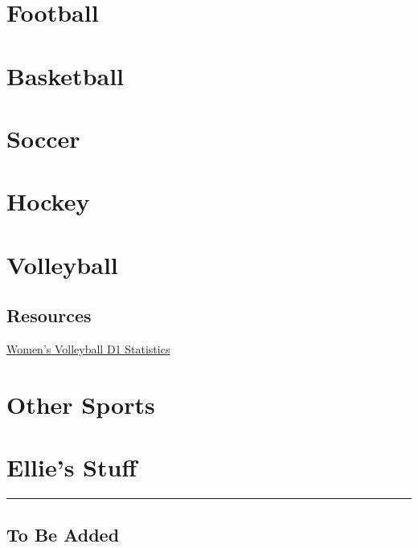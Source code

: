 \documentclass[
]{book}
\theoremstyle{definition}
\theoremstyle{definition}
\theoremstyle{definition}
\theoremstyle{definition}
\theoremstyle{remark}
\begin{document}
\hypertarget{football-1}{%
\chapter{Football}\label{football-1}}

\hypertarget{basketball-1}{%
\chapter{Basketball}\label{basketball-1}}

\hypertarget{soccer-1}{%
\chapter{Soccer}\label{soccer-1}}

\hypertarget{hockey-1}{%
\chapter{Hockey}\label{hockey-1}}

\hypertarget{volleyball-1}{%
\chapter{Volleyball}\label{volleyball-1}}

\hypertarget{resources}{%
\section{Resources}\label{resources}}

\href{https://www.ncaa.com/stats/volleyball-women/d1}{Women's Volleyball D1 Statistics}

\hypertarget{other-sports}{%
\chapter{Other Sports}\label{other-sports}}

\hypertarget{ellies-stuff}{%
\chapter{Ellie's Stuff}\label{ellies-stuff}}

\begin{center}\rule{0.5\linewidth}{0.5pt}\end{center}

\hypertarget{to-be-added}{%
\section{To Be Added}\label{to-be-added}}
\end{document}

